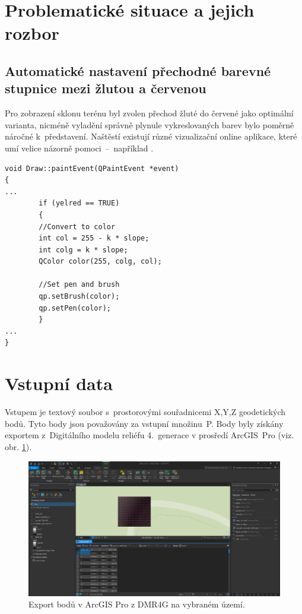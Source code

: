 \documentclass[a4paper, 12pt, oneside, titlepage]{article} %
\begin{document}
\section{Problematické situace a jejich rozbor} \label{problemrozbor}
\subsection{Automatické nastavení přechodné barevné stupnice mezi žlutou a červenou}
Pro zobrazení sklonu terénu byl zvolen přechod žluté do červené jako optimální varianta, nicméně vyladění správně plynule vykreslovaných barev bylo poměrně náročné k~představení. Naštěstí existují různé vizualizační online aplikace, které umí velice názorně pomoci~--~například \cite{rgbcol}.

\begin{verbatim}
void Draw::paintEvent(QPaintEvent *event)
{
...
        if (yelred == TRUE)
        {
        //Convert to color
        int col = 255 - k * slope;
        int colg = k * slope;
        QColor color(255, colg, col);

        //Set pen and brush
        qp.setBrush(color);
        qp.setPen(color);
        }
...
}
\end{verbatim}


\section{Vstupní data}
Vstupem je textový soubor s~prostorovými souřadnicemi X,Y,Z geodetických bodů. Tyto body jsou považovány za vstupní množinu~P. Body byly získány exportem z~Digitálního modelu reliéfu 4.~generace \cite{ZABAGED} v prosředí ArcGIS~Pro \cite{arcgispro} (viz. obr. \ref{fig:arcgis_body}). 

\begin{figure}[!htb]
	\centering
	\includegraphics[scale=0.33]{obrazky/arcgis_body.png} 
	\caption{Export bodů v ArcGIS Pro z DMR4G na vybraném území.
	}
	\label{fig:arcgis_body}
\end{figure} 
\FloatBarrier
\end{document}
